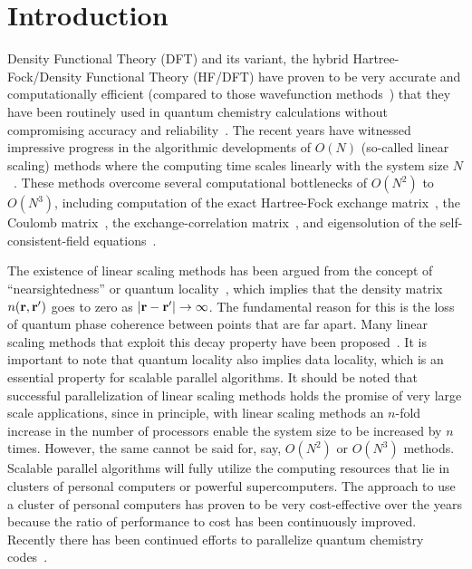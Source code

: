 \documentclass[preprint]{revtex4}
\begin{document}
\section{Introduction}
\label{sec:intro}
Density Functional Theory (DFT) and its variant, the hybrid
Hartree-Fock/Density Functional Theory (HF/DFT) have proven to be very
accurate and computationally efficient (compared to those wavefunction
methods~\cite{Kohn_99v71}) that they have been routinely used in
quantum chemistry calculations without compromising accuracy and
reliability~\cite{Becke93,bjohnson93b,Stephens94,Perdew_96v77}. The
recent years have witnessed impressive progress in the algorithmic
developments of $O(N)$ (so-called linear scaling) methods where the
computing time scales linearly with the system size
$N$~\cite{Schwegler96,Challacombe97,%
Scuseria99,Challacombe99,Goedecker99}.  These methods overcome several
computational bottlenecks of $O(N^2)$ to $O(N^3)$, including
computation of the exact Hartree-Fock exchange
matrix~\cite{Schwegler96}, the Coulomb matrix~\cite{Challacombe97},
the exchange-correlation matrix~\cite{Challacombe_00v113}, and
eigensolution of the self-consistent-field
equations~\cite{Challacombe99,Niklasson02}.

The existence of linear scaling methods has been argued from the
concept of ``nearsightedness'' or quantum
locality~\cite{WKohn95,WKohn96}, which implies that the density matrix
$n({\bf r},{\bf r'})$ goes to zero as $|{\bf r}-{\bf r'}| \rightarrow
\infty$. The fundamental reason for this is the loss of quantum phase
coherence between points that are far apart.  Many linear scaling
methods that exploit this decay property have been
proposed~\cite{XLi93,Hernandez96}. It is important to note that
quantum locality also implies data locality, which is an essential
property for scalable parallel algorithms. It should be noted that
successful parallelization of linear scaling methods holds the promise
of very large scale applications, since in principle, with linear
scaling methods an $n$-fold increase in the number of processors
enable the system size to be increased by $n$ times.  However, the
same cannot be said for, say, $O(N^2)$ or $O(N^3)$ methods.  Scalable
parallel algorithms will fully utilize the computing resources that
lie in clusters of personal computers or powerful supercomputers. The
approach to use a cluster of personal computers has proven to be very
cost-effective over the years because the ratio of performance to cost
has been continuously improved. Recently there has been continued
efforts to parallelize quantum chemistry
codes~\cite{Harrison_94v45,Guerra_95,Sosa_98v19,%
Stephan_98v108,Furlani_00v128,Sosa_00v26,Yoshihiro_01v346,Baker_02v23}.
\end{document}
